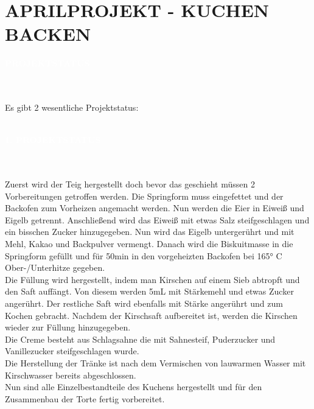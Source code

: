\documentclass[a4paper, 12 pt]{article}
\newcommand{\coloredSectionDark}[1]{{\small \colorbox{DodgerBlue2}{\begin{minipage}{0.99\textwidth}{\textbf{#1 \vphantom{p\^{E}}}}\end{minipage}}}}
\newcommand{\coloredSection}[1]{{\small \colorbox{DeepSkyBlue1}{\begin{minipage}{0.99\textwidth}{\textbf{#1 \vphantom{p\^{E}}}}\end{minipage}}}}
\begin{document}
\section*{\textcolor{DodgerBlue2}{APRILPROJEKT - KUCHEN BACKEN}}

\noindent
\coloredSectionDark{\textbf{\textcolor{white}{PROJEKTSTATUS}}}\\[-0.3cm]\\
Es gibt 2 wesentliche Projektstatus:\\\\
\noindent
\coloredSection{\textbf{\textcolor{white}{1. PROJEKTSTATUS}}}\\[-0.3cm]\\
Zuerst wird der Teig hergestellt doch bevor das geschieht müssen 2 Vorbereitungen getroffen werden. 
Die Springform muss eingefettet und der Backofen zum Vorheizen angemacht werden. Nun werden die Eier in Eiweiß und Eigelb getrennt.
Anschließend wird das Eiweiß mit etwas Salz steifgeschlagen und ein bisschen Zucker hinzugegeben. Nun wird das Eigelb untergerührt und mit Mehl, Kakao und Backpulver
vermengt. Danach wird die Biskuitmasse in die Springform gefüllt und für 50min in den vorgeheizten Backofen bei 165° C Ober-/Unterhitze
gegeben.\\
Die Füllung wird hergestellt, indem man Kirschen auf einem Sieb abtropft und den Saft auffängt. Von diesem werden 5mL mit Stärkemehl und etwas Zucker
angerührt. Der restliche Saft wird ebenfalls mit Stärke angerührt und zum Kochen gebracht. Nachdem der Kirschsaft aufbereitet ist, werden die Kirschen wieder zur Füllung hinzugegeben. \\
Die Creme besteht aus Schlagsahne die mit Sahnesteif, Puderzucker und Vanillezucker steifgeschlagen wurde.\\
Die Herstellung der Tränke ist nach dem Vermischen von lauwarmen Wasser mit Kirschwasser bereits abgeschlossen. \\
Nun sind alle Einzelbestandteile des Kuchens hergestellt und für den Zusammenbau der Torte fertig vorbereitet.\\
\end{document}
